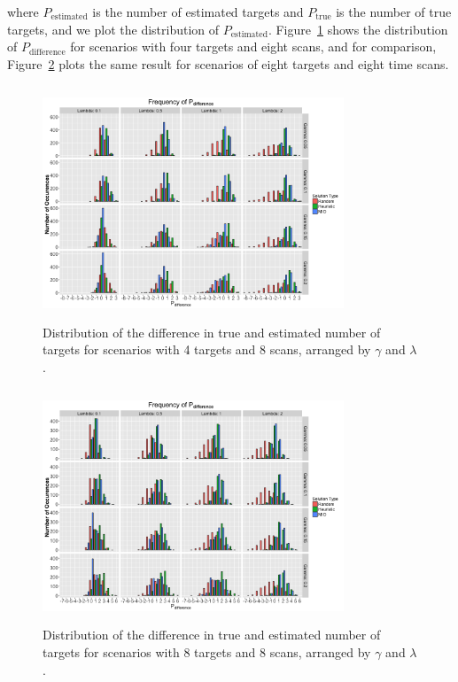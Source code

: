 \documentclass[journal]{IEEEtran}
\begin{document}
where $P_{\text{estimated}}$ is the number of estimated targets and $ P_{\text{true}}$ is the number of true targets, and we plot the distribution of $P_{\text{estimated}}$. Figure~\ref{fig:Robust_4_8_Histogram} shows the distribution of $P_{\text{difference}}$ for scenarios with four targets and eight scans, and for comparison, Figure~\ref{fig:Robust_8_8_Histogram} plots the same result for scenarios of eight targets and eight time scans. 
\begin{figure}[h]
  \centering
  \includegraphics[width=9cm, height=7cm]{4_8_Histogram}
  \caption{Distribution of the difference in true and estimated number of targets for scenarios with 4 targets and 8 scans, arranged by $\gamma$ and $\lambda$.}
  \label{fig:Robust_4_8_Histogram}
\end{figure}

\begin{figure}[h]
  \centering
  \includegraphics[width=9cm, height=7cm]{8_8_Histogram}
  \caption{Distribution of the difference in true and estimated number of targets for scenarios with 8 targets and 8 scans, arranged by $\gamma$ and $\lambda$.}
  \label{fig:Robust_8_8_Histogram}
\end{figure}
\end{document}
